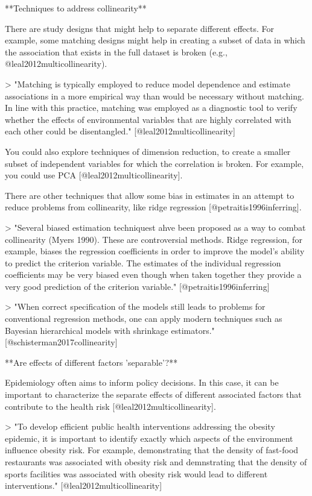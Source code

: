 **Techniques to address collinearity**

There are study designs that might help to separate different effects. For
example, some matching designs might help in creating a subset of data in which
the association that exists in the full dataset is broken (e.g.,
@leal2012multicollinearity).

> "Matching is typically employed to reduce model dependence and estimate 
associations in a more empirical way than would be necessary without 
matching. In line with this practice, matching was employed as a diagnostic
tool to verify whether the effects of environmental variables that are highly 
correlated with each other could be disentangled." [@leal2012multicollinearity]

You could also explore techniques of dimension reduction, to create a smaller
subset of independent variables for which the correlation is broken. For
example, you could use PCA [@leal2012multicollinearity].

There are other techniques that allow some bias in estimates in an attempt to
reduce problems from collinearity, like ridge regression
[@petraitis1996inferring].

> "Several biased estimation techniquest ahve been proposed as a way to combat
collinearity (Myers 1990). These are controversial methods. Ridge regression,
for example, biases the regression coefficients in order to improve the model's
ability to predict the criterion variable. The estimates of the individual
regression coefficients may be very biased even though when taken together they
provide a very good prediction of the criterion variable."
[@petraitis1996inferring]

> "When correct specification of the models still leads to 
problems for conventional regression methods, one can apply modern techniques
such as Bayesian hierarchical models with shrinkage estimators."
[@schisterman2017collinearity]

**Are effects of different factors 'separable'?**

Epidemiology often aims to inform policy decisions. In this case, it can be
important to characterize the separate effects of different associated factors
that contribute to the health risk [@leal2012multicollinearity].

> "To develop efficient public health interventions addressing the obesity 
epidemic, it is important to identify exactly which aspects of the
environment influence obesity risk. For example, demonstrating that the density 
of fast-food restaurants was associated with obesity risk and demnstrating that
the density of sports facilities was associated with obesity risk would lead to 
different interventions." [@leal2012multicollinearity]

